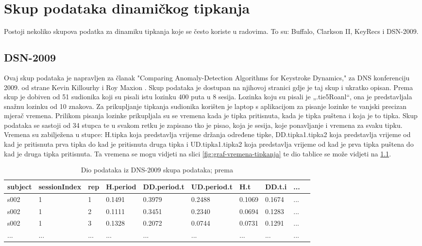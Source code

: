 \documentclass[]{foi}
\begin{document}
\chapter{Skup podataka dinamičkog tipkanja}
Postoji nekoliko skupova podatka za dinamiku tipkanja koje se često koriste u radovima. To su: Buffalo, Clarkson II, KeyRecs i DSN-2009.

\section{DSN-2009}

Ovaj skup podataka je napravljen za članak "Comparing Anomaly-Detection Algorithms for Keystroke Dynamics,"  za DNS konferenciju 2009. od strane Kevin Killourhy i Roy Maxion \cite{DNS}. Skup podataka je dostupan na njihovoj stranici \cite{DNS} gdje je taj skup i ukratko opisan. Prema \cite{DNS} skup je dobiven od 51 sudionika koji su pisali istu lozinku 400 puta u 8 sesija. Lozinka koju su pisali je „.tie5Roanl“, ona je predstavljala snažnu lozinku od 10 znakova. Za prikupljanje tipkanja sudionika korišten je laptop s aplikacijom za pisanje lozinke te vanjski precizan mjerač vremena. Prilikom pisanja lozinke prikupljala su se vremena kada je tipka pritisnuta, kada je tipka puštena i koja je to tipka. Skup podataka se sastoji od 34 stupca te u svakom retku je zapisano tko je pisao, koja je sesija, koje ponavljanje i vremena za svaku tipku. Vremena su zabilježena u stupce: H.tipka koja predstavlja vrijeme držanja određene tipke, DD.tipka1.tipka2 koja predstavlja vrijeme od kad je pritisnuta prva tipka do kad je pritisnuta druga tipka i UD.tipka1.tipka2 koja predstavlja vrijeme od kad je prva tipka puštena do kad je druga tipka pritisnuta. Ta vremena se mogu vidjeti na slici \ref{fig:graf-vremena-tipkanja} te dio tablice se može vidjeti na \ref{tab:DNS-podaci}.

\begin{table}[!h]
    \centering
    \caption{Dio podataka iz DNS-2009 skupa podataka; prema \cite{DNS}}
    \begin{tabularx}{1\textwidth}{|l|l|l|l|l|l|l|l|l|l|}
    \hline
        \cellcolor{gray!25}subject & \cellcolor{gray!25}sessionIndex & \cellcolor{gray!25}rep & \cellcolor{gray!25}H.period & \cellcolor{gray!25}DD.period.t & \cellcolor{gray!25}UD.period.t & \cellcolor{gray!25}H.t & \cellcolor{gray!25}DD.t.i & \cellcolor{gray!25}... \\ \hline
        s002 & 1 & 1 & 0.1491 & 0.3979 & 0.2488 & 0.1069 & 0.1674 & ... \\ \hline
        s002 & 1 & 2 & 0.1111 & 0.3451 & 0.2340 & 0.0694 & 0.1283 & ... \\ \hline
        s002 & 1 & 3 & 0.1328 & 0.2072 & 0.0744 & 0.0731 & 0.1291 & ... \\ \hline
        ... & ... & ... & ... & ... & ... & ... & ... & ... \\ \hline
    \end{tabularx}
    \\[10pt]
    \label{tab:DNS-podaci}
\end{table}
\end{document}
